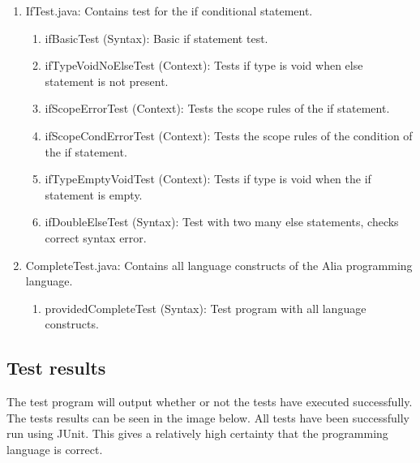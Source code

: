 \documentclass[paper=a4, fontsize=11pt]{article}
\numberwithin{equation}{section}		%
\numberwithin{figure}{section}			%
\numberwithin{table}{section}				%
\begin{document}
\begin{enumerate}
\item IfTest.java: Contains test for the if conditional statement.
  \begin{enumerate}
  \item ifBasicTest (Syntax): Basic if statement test.
  \item ifTypeVoidNoElseTest (Context): Tests if type is void when else statement is not present.
  \item ifScopeErrorTest (Context): Tests the scope rules of the if statement.
  \item ifScopeCondErrorTest (Context): Tests the scope rules of the condition of the if statement.
  \item ifTypeEmptyVoidTest (Context): Tests if type is void when the if statement is empty.
  \item ifDoubleElseTest (Syntax): Test with two many else statements, checks correct syntax error.
  \end{enumerate}
\item CompleteTest.java: Contains all language constructs of the Alia programming language.
  \begin{enumerate}
  \item providedCompleteTest (Syntax): Test program with all language constructs.
  \end{enumerate}
\end{enumerate}

\subsection{Test results}
The test program will output whether or not the tests have executed successfully. The tests results can be seen in the image below. All tests have been successfully run using JUnit. This gives a relatively high certainty that the programming language is correct.
\end{document}
